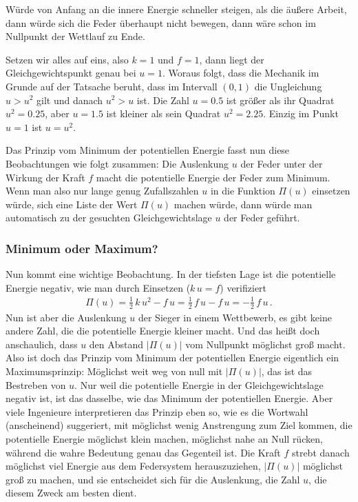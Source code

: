 W\"{u}rde von Anfang an die innere Energie schneller steigen, als die \"{a}u{\ss}ere Arbeit, dann w\"{u}rde sich die Feder \"{u}berhaupt nicht bewegen, dann w\"{a}re schon im Nullpunkt der Wettlauf zu Ende.

Setzen wir alles auf eins, also $ k = 1$ und $ f = 1 $, dann liegt der Gleich\-gewichtspunkt genau bei $ u = 1$. Woraus folgt, dass die Mechanik im Grunde auf der Tatsache beruht, dass im Intervall $(0,1)$
die Ungleichung $u > u^2$ gilt und danach $u^2 > u$ ist. Die Zahl $u = 0.5$ ist gr\"{o}{\ss}er als ihr Quadrat $u^2 = 0.25$, aber $u = 1.5$ ist kleiner als sein Quadrat $u^2 = 2.25$. Einzig im Punkt $u = 1$ ist $u = u^2$.

Das Prinzip vom Minimum der potentiellen Energie fasst nun diese Beobachtungen wie folgt zusammen: Die Auslenkung $ u $ der Feder unter der Wirkung der Kraft $ f $ macht die potentielle Energie der Feder zum Minimum. Wenn man also nur lange genug Zufallszahlen $ u $ in die Funktion $\Pi(u)$ einsetzen w\"{u}rde, sich eine Liste der Wert $\Pi(u)$ machen w\"{u}rde, dann w\"{u}rde man automatisch zu der gesuchten Gleichgewichtslage $u$ der Feder gef\"{u}hrt.

\subsubsection{Minimum oder Maximum?}
Nun kommt eine wichtige Beobachtung. In der tiefsten Lage ist die potentielle Energie negativ, wie man durch Einsetzen ($ k\,u = f$) verifiziert
\begin{align}
\Pi(u) = \frac{1}{2}\,k\,u^2 - f\,u = \frac{1}{2}\, f\,u - f\,u = - \frac{1}{2}\, f\,u\,.
\end{align}
Nun ist aber die Auslenkung $ u $ der Sieger in einem Wettbewerb, es gibt keine andere Zahl, die die potentielle Energie kleiner macht. Und das hei{\ss}t doch anschaulich, dass $ u $ den Abstand $|\Pi(u)|$ vom Nullpunkt m\"{o}glichst gro{\ss} macht. Also ist doch das Prinzip vom Minimum der potentiellen Energie eigentlich ein Maximumsprinzip: M\"{o}glichst weit weg von null mit $|\Pi(u)|$, das ist das Bestreben von $u$. Nur weil die potentielle Energie in der Gleichgewichtslage negativ ist, ist das dasselbe, wie das Minimum der potentiellen Energie. Aber viele Ingenieure interpretieren das Prinzip eben so, wie es die Wortwahl (anscheinend)  suggeriert, mit m\"{o}glichst wenig Anstrengung zum Ziel kommen, die potentielle Energie m\"{o}glichst klein machen, m\"{o}glichst nahe an Null r\"{u}cken, w\"{a}hrend die wahre Bedeutung genau das Gegenteil ist. Die Kraft $ f $ strebt danach m\"{o}glichst viel Energie aus dem Federsystem herauszuziehen, $|\Pi(u)|$ m\"{o}glichst gro{\ss} zu machen, und sie entscheidet sich f\"{u}r die Auslenkung, die Zahl $u$, die diesem Zweck am besten dient.\\

